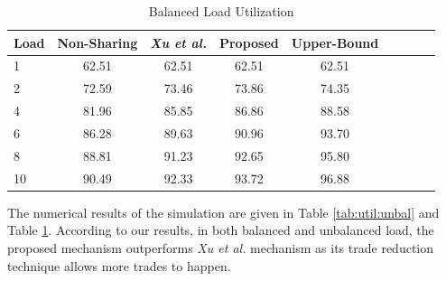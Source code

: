 \begin{table}[htbp]
   \caption{Balanced Load Utilization}
   \label{tab:util:bal}
   \small %
   \centering %
   \begin{tabular}{lcccccccr} %
   \toprule[\heavyrulewidth]\toprule[\heavyrulewidth]
       Load & Non-Sharing    & \textit{Xu et al.} & Proposed    & Upper-Bound \\ \hline
   \midrule
    1  & 62.51  & 62.51 & 62.51  & 62.51\\
    2  & 72.59  & 73.46 & 73.86  & 74.35\\
    4  & 81.96  & 85.85 & 86.86  & 88.58\\
    6  & 86.28  & 89.63 & 90.96  & 93.70\\
    8  & 88.81  & 91.23 & 92.65  & 95.80\\
    10 & 90.49  & 92.33 & 93.72  & 96.88\\
   \bottomrule[\heavyrulewidth]
   \end{tabular}
\end{table}

The numerical results of the simulation are given in Table \ref{tab:util:unbal} and Table \ref{tab:util:bal}. According to our results, in both balanced and unbalanced load, the proposed mechanism outperforms \textit{Xu et al.} mechanism as its trade reduction technique allows more trades to happen.




